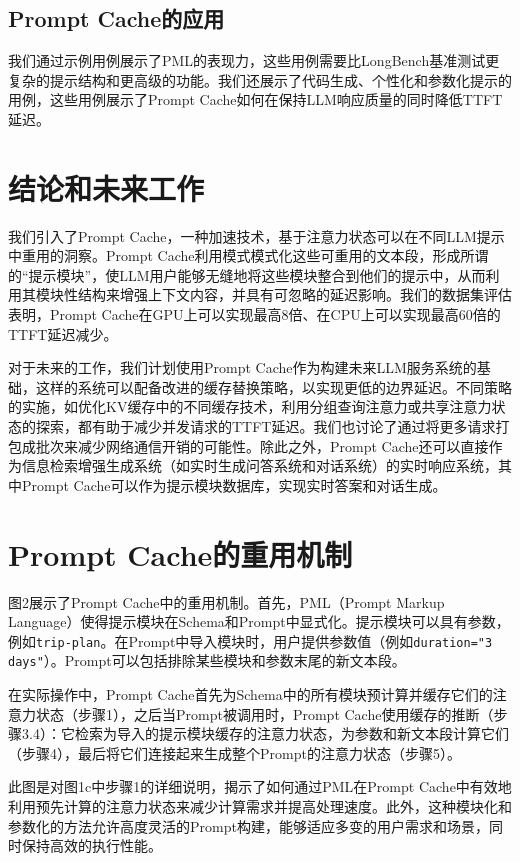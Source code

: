 \documentclass[twocolumn, 10pt]{article} %
\theoremstyle{remark}
\begin{document}
\subsection{Prompt Cache的应用}

我们通过示例用例展示了PML的表现力，这些用例需要比LongBench基准测试更复杂的提示结构和更高级的功能。我们还展示了代码生成、个性化和参数化提示的用例，这些用例展示了Prompt Cache如何在保持LLM响应质量的同时降低TTFT延迟。


\section{结论和未来工作}

我们引入了Prompt Cache，一种加速技术，基于注意力状态可以在不同LLM提示中重用的洞察。Prompt Cache利用模式模式化这些可重用的文本段，形成所谓的“提示模块”，使LLM用户能够无缝地将这些模块整合到他们的提示中，从而利用其模块性结构来增强上下文内容，并具有可忽略的延迟影响。我们的数据集评估表明，Prompt Cache在GPU上可以实现最高8倍、在CPU上可以实现最高60倍的TTFT延迟减少。

对于未来的工作，我们计划使用Prompt Cache作为构建未来LLM服务系统的基础，这样的系统可以配备改进的缓存替换策略，以实现更低的边界延迟。不同策略的实施，如优化KV缓存中的不同缓存技术，利用分组查询注意力或共享注意力状态的探索，都有助于减少并发请求的TTFT延迟。我们也讨论了通过将更多请求打包成批次来减少网络通信开销的可能性。除此之外，Prompt Cache还可以直接作为信息检索增强生成系统（如实时生成问答系统和对话系统）的实时响应系统，其中Prompt Cache可以作为提示模块数据库，实现实时答案和对话生成。

\section{Prompt Cache的重用机制}

图2展示了Prompt Cache中的重用机制。首先，PML（Prompt Markup Language）使得提示模块在Schema和Prompt中显式化。提示模块可以具有参数，例如\texttt{trip-plan}。在Prompt中导入模块时，用户提供参数值（例如\texttt{duration="3 days"}）。Prompt可以包括排除某些模块和参数末尾的新文本段。

在实际操作中，Prompt Cache首先为Schema中的所有模块预计算并缓存它们的注意力状态（步骤1），之后当Prompt被调用时，Prompt Cache使用缓存的推断（步骤3.4）：它检索为导入的提示模块缓存的注意力状态，为参数和新文本段计算它们（步骤4），最后将它们连接起来生成整个Prompt的注意力状态（步骤5）。

此图是对图1c中步骤1的详细说明，揭示了如何通过PML在Prompt Cache中有效地利用预先计算的注意力状态来减少计算需求并提高处理速度。此外，这种模块化和参数化的方法允许高度灵活的Prompt构建，能够适应多变的用户需求和场景，同时保持高效的执行性能。
\end{document}
